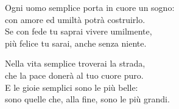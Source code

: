 
\strofa Ogni uomo semplice porta in cuore un sogno:\\
con amore ed umiltà potrà costruirlo.\\
Se con fede tu saprai vivere umilmente,\\
più felice tu sarai, anche senza niente.

\spazio


\spazio

\strofa Nella vita semplice troverai la strada,\\
che la pace donerà al tuo cuore puro.\\
E le gioie semplici sono le più belle:\\
sono quelle che, alla fine, sono le più grandi.

\spazio

%
%
%
%
